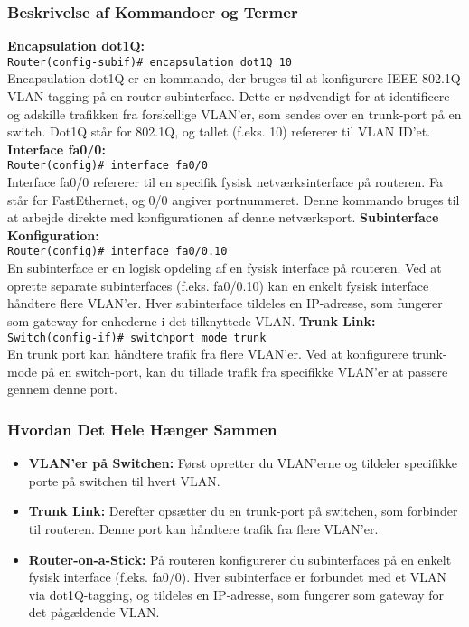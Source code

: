 \subsubsection{Beskrivelse af Kommandoer og Termer}
\textbf{Encapsulation dot1Q:} \\
\texttt{Router(config-subif)\# encapsulation dot1Q 10} \\
Encapsulation dot1Q er en kommando, der bruges til at konfigurere IEEE 802.1Q VLAN-tagging på en router-subinterface. Dette er nødvendigt for at identificere og adskille trafikken fra forskellige VLAN'er, som sendes over en trunk-port på en switch. Dot1Q står for 802.1Q, og tallet (f.eks. 10) refererer til VLAN ID'et.
\newline\newline\noindent
\textbf{Interface fa0/0:} \\
\texttt{Router(config)\# interface fa0/0} \\
Interface fa0/0 refererer til en specifik fysisk netværksinterface på routeren. Fa står for FastEthernet, og 0/0 angiver portnummeret. Denne kommando bruges til at arbejde direkte med konfigurationen af denne netværksport.
\newline\newline\noindent
\textbf{Subinterface Konfiguration:} \\
\texttt{Router(config)\# interface fa0/0.10} \\
En subinterface er en logisk opdeling af en fysisk interface på routeren. Ved at oprette separate subinterfaces (f.eks. fa0/0.10) kan en enkelt fysisk interface håndtere flere VLAN'er. Hver subinterface tildeles en IP-adresse, som fungerer som gateway for enhederne i det tilknyttede VLAN.
\newline\newline\noindent
\textbf{Trunk Link:} \\
\texttt{Switch(config-if)\# switchport mode trunk} \\
En trunk port kan håndtere trafik fra flere VLAN'er. Ved at konfigurere trunk-mode på en switch-port, kan du tillade trafik fra specifikke VLAN'er at passere gennem denne port.

\subsubsection{Hvordan Det Hele Hænger Sammen}
\begin{itemize}
	\item \textbf{VLAN'er på Switchen:} Først opretter du VLAN'erne og tildeler specifikke porte på switchen til hvert VLAN.
	\item \textbf{Trunk Link:} Derefter opsætter du en trunk-port på switchen, som forbinder til routeren. Denne port kan håndtere trafik fra flere VLAN'er.
	\item \textbf{Router-on-a-Stick:} På routeren konfigurerer du subinterfaces på en enkelt fysisk interface (f.eks. fa0/0). Hver subinterface er forbundet med et VLAN via dot1Q-tagging, og tildeles en IP-adresse, som fungerer som gateway for det pågældende VLAN.
\end{itemize}


